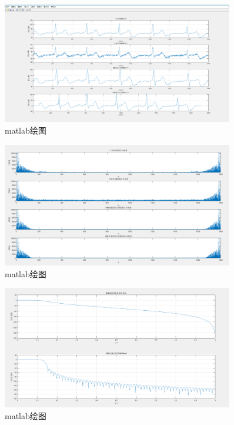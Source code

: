 \documentclass[12pt,hyperref,a4paper,UTF8]{ctexart}
\begin{document}
\begin{figure}[H] %
        \centering
        \includegraphics[width=0.9\textwidth]{figures/2_1.png} %
        \caption{matlab绘图} %
        \label{fig:example} %
\end{figure}

\begin{figure}[H] %
        \centering
        \includegraphics[width=0.9\textwidth]{figures/2_2.png} %
        \caption{matlab绘图} %
        \label{fig:example} %
\end{figure}

\begin{figure}[H] %
        \centering
        \includegraphics[width=0.9\textwidth]{figures/2_3.png} %
        \caption{matlab绘图} %
        \label{fig:example} %
\end{figure}
\end{document}
